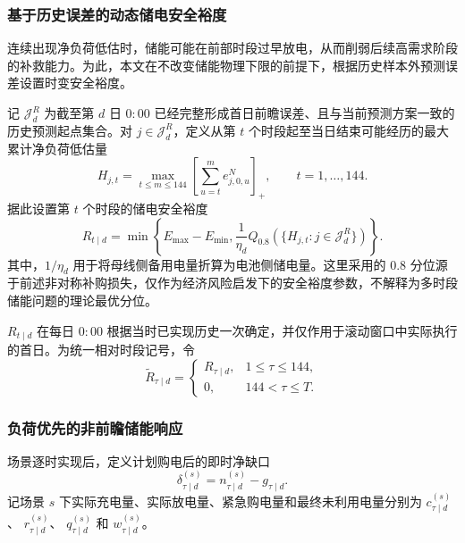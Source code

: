 \documentclass[zihao=-4,a4paper,UTF8,fontset=none]{ctexart}
\begin{document}
\subsubsection{基于历史误差的动态储电安全裕度}

连续出现净负荷低估时，储能可能在前部时段过早放电，从而削弱后续高需求阶段的补救能力。为此，本文在不改变储能物理下限的前提下，根据历史样本外预测误差设置时变安全裕度。

记 $\mathcal J_d^{R}$ 为截至第 $d$ 日 $0{:}00$ 已经完整形成首日前瞻误差、且与当前预测方案一致的历史预测起点集合。对
$j\in\mathcal J_d^{R}$，定义从第 $t$ 个时段起至当日结束可能经历的最大累计净负荷低估量
\begin{equation}
    H_{j,t}
    =
    \max_{t\le m\le144}
    \left[
        \sum_{u=t}^{m}
        e_{j,0,u}^{N}
    \right]_+,
    \qquad
    t=1,\ldots,144 .
    \label{eq:q2_future_pressure}
\end{equation}
据此设置第 $t$ 个时段的储电安全裕度
\begin{equation}
    R_{t\mid d}
    =
    \min
    \left\{
        E_{\max}-E_{\min},
        \frac{1}{\eta_d}
        Q_{0.8}
        \left(
            \{H_{j,t}:j\in\mathcal J_d^{R}\}
        \right)
    \right\}.
    \label{eq:q2_dynamic_reserve}
\end{equation}
其中，$1/\eta_d$ 用于将母线侧备用电量折算为电池侧储电量。这里采用的 $0.8$ 分位源于前述非对称补购损失，仅作为经济风险启发下的安全裕度参数，不解释为多时段储能问题的理论最优分位。

$R_{t\mid d}$ 在每日 $0{:}00$ 根据当时已实现历史一次确定，并仅作用于滚动窗口中实际执行的首日。为统一相对时段记号，令
\[
\widetilde R_{\tau\mid d}
=
\begin{cases}
R_{\tau\mid d}, & 1\le\tau\le144,\\
0, & 144<\tau\le T.
\end{cases}
\]


\subsubsection{负荷优先的非前瞻储能响应}

场景逐时实现后，定义计划购电后的即时净缺口
\[
\delta_{\tau\mid d}^{(s)}
=
n_{\tau\mid d}^{(s)}
-
g_{\tau\mid d}.
\]
记场景 $s$ 下实际充电量、实际放电量、紧急购电量和最终未利用电量分别为
$c_{\tau\mid d}^{(s)}$、
$r_{\tau\mid d}^{(s)}$、
$q_{\tau\mid d}^{(s)}$ 和
$w_{\tau\mid d}^{(s)}$。
\end{document}
